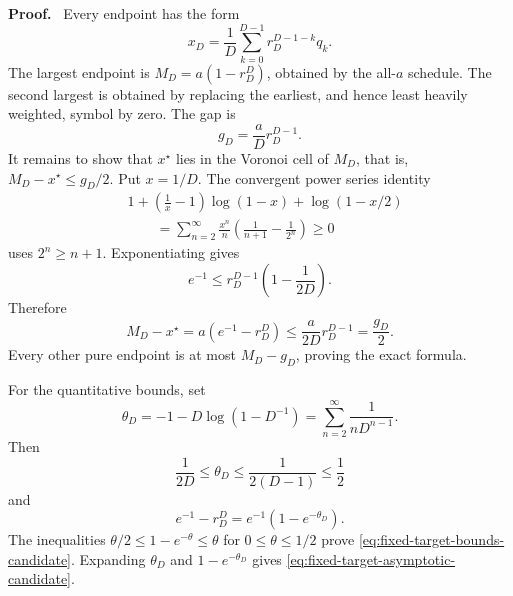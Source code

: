 \documentclass[twoside,11pt]{article}
\renewenvironment{proof}[1][Proof]{\par\noindent\textbf{#1.}\ }{\hfill\BlackBox\par\medskip}
\begin{document}

\begin{proof}
Every endpoint has the form
\[
  x_D=\frac1D\sum_{k=0}^{D-1}r_D^{D-1-k}q_k.
\]
The largest endpoint is
$M_D=a(1-r_D^D)$, obtained by the all-$a$ schedule.  The second largest is
obtained by replacing the earliest, and hence least heavily weighted, symbol
by zero.  The gap is
\[
  g_D=\frac{a}{D}r_D^{D-1}.
\]
It remains to show that $x^\star$ lies in the Voronoi cell of $M_D$, that is,
$M_D-x^\star\le g_D/2$.  Put $x=1/D$.  The convergent power series identity
\begin{align*}
 &1+\left(\frac1x-1\right)\log(1-x)+\log(1-x/2)\\
 &\qquad=\sum_{n=2}^{\infty}
   \frac{x^n}{n}\left(\frac1{n+1}-\frac1{2^n}\right)\ge0
\end{align*}
uses $2^n\ge n+1$.  Exponentiating gives
\[
  e^{-1}\le r_D^{D-1}\left(1-\frac1{2D}\right).
\]
Therefore
\[
  M_D-x^\star
  =a(e^{-1}-r_D^D)
  \le \frac{a}{2D}r_D^{D-1}=\frac{g_D}{2}.
\]
Every other pure endpoint is at most $M_D-g_D$, proving the exact formula.

For the quantitative bounds, set
\[
  \theta_D=-1-D\log(1-D^{-1})
  =\sum_{n=2}^{\infty}\frac{1}{nD^{n-1}}.
\]
Then
\[
  \frac1{2D}\le\theta_D\le\frac1{2(D-1)}\le\frac12
\]
and
\[
  e^{-1}-r_D^D=e^{-1}(1-e^{-\theta_D}).
\]
The inequalities $\theta/2\le1-e^{-\theta}\le\theta$ for
$0\le\theta\le1/2$ prove \eqref{eq:fixed-target-bounds-candidate}.  Expanding
$\theta_D$ and $1-e^{-\theta_D}$ gives
\eqref{eq:fixed-target-asymptotic-candidate}.
\end{proof}
\end{document}

